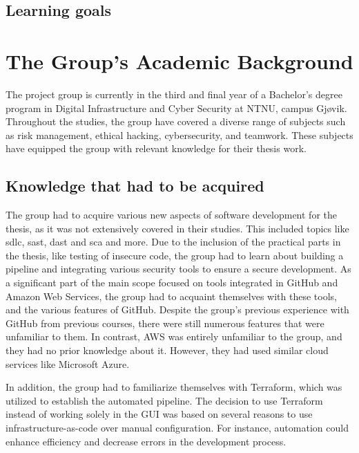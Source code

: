 \subsection{Learning goals} %

\section{The Group’s Academic Background}
The project group is currently in the third and final year of a Bachelor's degree program in Digital Infrastructure and Cyber Security at NTNU, campus Gjøvik. Throughout the studies, the group have covered a diverse range of subjects such as risk management, ethical hacking, cybersecurity, and teamwork. These subjects have equipped the group with relevant knowledge for their thesis work.

\subsection{Knowledge that had to be acquired}
\label{section:Knowledge that had to be acquired}
The group had to acquire various new aspects of software development for the thesis, as it was not extensively covered in their studies. This included topics like \acrshort{sdlc}, \acrlong{sast}, \acrlong{dast} and \acrlong{sca} and more. Due to the inclusion of the practical parts in the thesis, like testing of insecure code, the group had to learn about building a pipeline and integrating various security tools to ensure a secure development. As a significant part of the main scope focused on tools integrated in GitHub and Amazon Web Services, the group had to acquaint themselves with these tools, and the various features of GitHub. Despite the group's previous experience with GitHub from previous courses, there were still numerous features that were unfamiliar to them. In contrast, AWS was entirely unfamiliar to the group, and they had no prior knowledge about it. However, they had used similar cloud services like Microsoft Azure.

In addition, the group had to familiarize themselves with Terraform, which was utilized to establish the automated pipeline. The decision to use Terraform instead of working solely in the GUI was based on several reasons to use infrastructure-as-code over manual configuration. For instance, automation could enhance efficiency and decrease errors in the development process.



